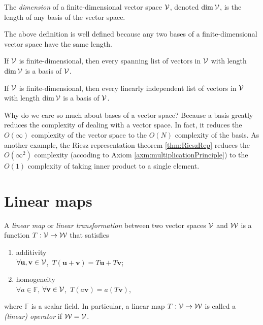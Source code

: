 \begin{defn}
  The \emph{dimension} of a finite-dimensional vector space
  ${\cal V}$,
  denoted $\dim {\cal V}$,
  is the length of any basis of the vector space.
\end{defn}

\begin{rem}
  The above definition is well defined because
  any two bases of a finite-dimensional vector space
  have the same length.
\end{rem}

\begin{lem}
  \label{lem:spanningListAndDimImpliesBasis}
  If ${\cal V}$ is finite-dimensional,
  then every spanning list of vectors in ${\cal V}$
  with length $\dim {\cal V}$
  is a basis of ${\cal V}$.
\end{lem}

\begin{lem}
  \label{lem:linearIndependenceAndDimImpliesBasis}
  If ${\cal V}$ is finite-dimensional,
  then every linearly independent list of vectors in ${\cal V}$
  with length $\dim {\cal V}$
  is a basis of ${\cal V}$.
\end{lem}

\begin{rem}
  Why do we care so much about bases of a vector space?
  Because a basis greatly reduces the complexity
  of dealing with a vector space.
  In fact, it reduces the $O(\infty)$ complexity
  of the vector space
  to the $O(N)$ complexity
  of the basis.
  As another example,
  the Riesz representation theorem \ref{thm:RieszRep}
  reduces the $O(\infty^2)$ complexity
  (accoding to Axiom \ref{axm:multiplicationPrinciple})
  to the $O(1)$ complexity of taking
  inner product to a single element.
\end{rem}


\section{Linear maps}
\label{sec:linear-maps}

\begin{defn}
  \label{def:linearMap}
  A \emph{linear map} or \emph{linear transformation}
  between two vector spaces ${\cal V}$ and ${\cal W}$
  is a function $T: {\cal V}\rightarrow{\cal W}$
  that satisfies
  \begin{enumerate}[(LNM-1)]\itemsep0em
    \itemsep0em
  \item additivity\\
    $\forall \mathbf{u}, \mathbf{v}\in {\cal V}$,\ 
    $T(\mathbf{u}+\mathbf{v}) = T\mathbf{u} + T\mathbf{v}$;
  \item homogeneity\\
    $\forall a\in \mathbb{F}$, $\forall\mathbf{v}\in{\cal V}$,\ 
    $T(a\mathbf{v})=a(T\mathbf{v})$,
  \end{enumerate}
  where $\mathbb{F}$ is a scalar field.
  In particular, a linear map $T: {\cal V}\rightarrow{\cal W}$
  is called a \emph{(linear) operator} if ${\cal W}={\cal V}$.
\end{defn}

